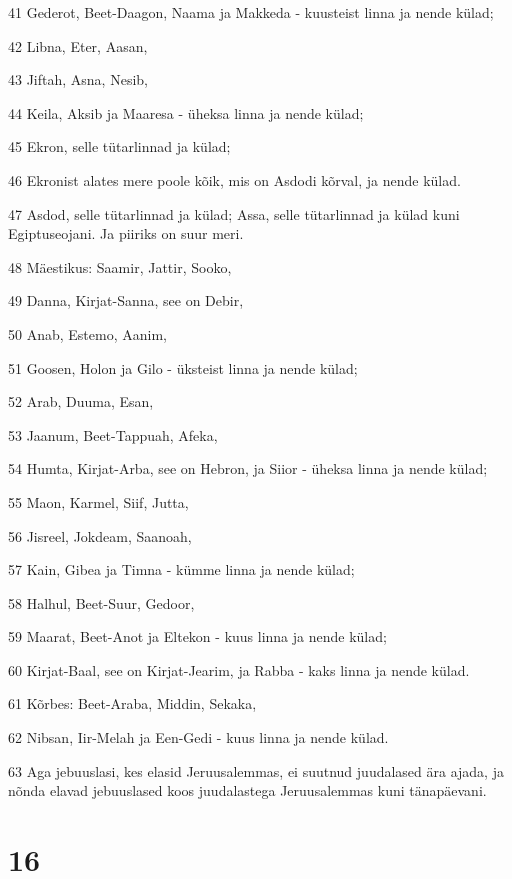 \par 41 Gederot, Beet-Daagon, Naama ja Makkeda - kuusteist linna ja nende külad;
\par 42 Libna, Eter, Aasan,
\par 43 Jiftah, Asna, Nesib,
\par 44 Keila, Aksib ja Maaresa - üheksa linna ja nende külad;
\par 45 Ekron, selle tütarlinnad ja külad;
\par 46 Ekronist alates mere poole kõik, mis on Asdodi kõrval, ja nende külad.
\par 47 Asdod, selle tütarlinnad ja külad; Assa, selle tütarlinnad ja külad kuni Egiptuseojani. Ja piiriks on suur meri.
\par 48 Mäestikus: Saamir, Jattir, Sooko,
\par 49 Danna, Kirjat-Sanna, see on Debir,
\par 50 Anab, Estemo, Aanim,
\par 51 Goosen, Holon ja Gilo - üksteist linna ja nende külad;
\par 52 Arab, Duuma, Esan,
\par 53 Jaanum, Beet-Tappuah, Afeka,
\par 54 Humta, Kirjat-Arba, see on Hebron, ja Siior - üheksa linna ja nende külad;
\par 55 Maon, Karmel, Siif, Jutta,
\par 56 Jisreel, Jokdeam, Saanoah,
\par 57 Kain, Gibea ja Timna - kümme linna ja nende külad;
\par 58 Halhul, Beet-Suur, Gedoor,
\par 59 Maarat, Beet-Anot ja Eltekon - kuus linna ja nende külad;
\par 60 Kirjat-Baal, see on Kirjat-Jearim, ja Rabba - kaks linna ja nende külad.
\par 61 Kõrbes: Beet-Araba, Middin, Sekaka,
\par 62 Nibsan, Iir-Melah ja Een-Gedi - kuus linna ja nende külad.
\par 63 Aga jebuuslasi, kes elasid Jeruusalemmas, ei suutnud juudalased ära ajada, ja nõnda elavad jebuuslased koos juudalastega Jeruusalemmas kuni tänapäevani.

\chapter{16}

